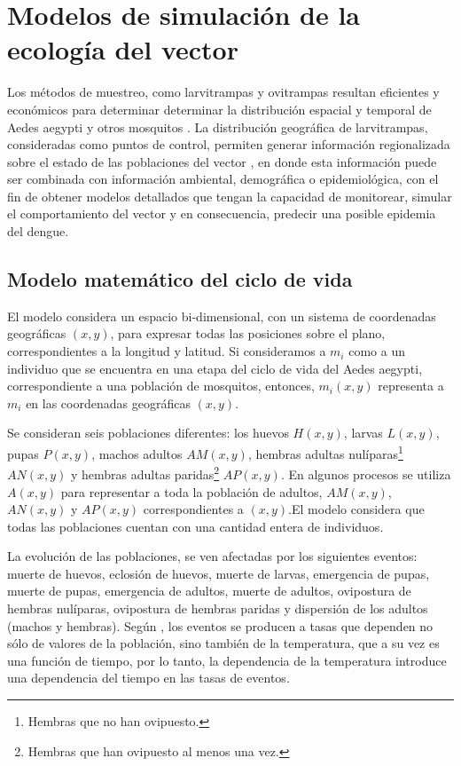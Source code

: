 \section{Modelos de simulación de la ecología del vector}
Los métodos de muestreo, como larvitrampas y ovitrampas resultan eficientes y económicos para
determinar determinar la distribución espacial y temporal de Aedes aegypti y otros mosquitos
\cite{dengueUruguayCap1, cenaprece2013}. La distribución geográfica de larvitrampas, consideradas
como puntos de control, permiten generar información regionalizada sobre el estado de las
poblaciones del vector \cite{NINO2011}, en donde esta información puede ser combinada con
información ambiental, demográfica o epidemiológica, con el fin de obtener modelos detallados que
tengan la capacidad de monitorear, simular el comportamiento del vector y en consecuencia,
predecir una posible epidemia del dengue.

\subsection{Modelo matemático del ciclo de vida}
El modelo considera un espacio bi-dimensional, con un sistema de coordenadas geográficas $(x,y)$,
para expresar todas las posiciones sobre el plano, correspondientes a la longitud y latitud. Si
consideramos a $m_{i}$ como a un individuo que se encuentra en una etapa del ciclo de vida del
Aedes aegypti, correspondiente a una población de mosquitos, entonces, $m_{i}(x,y)$ representa a
$m_{i}$ en las coordenadas geográficas $(x,y)$.

Se consideran seis poblaciones diferentes: los huevos $H(x,y)$, larvas $L(x,y)$, pupas $P(x,y)$,
machos adultos $AM(x,y)$, hembras adultas nulíparas\footnote{Hembras que no han ovipuesto.}
$AN(x,y)$ y hembras adultas paridas\footnote{Hembras que han ovipuesto al menos una vez.} $AP(x,y)$. En algunos procesos se utiliza $A(x, y)$ para representar a toda la población de adultos,
$AM(x,y)$, $AN(x,y)$ y $AP(x,y)$ correspondientes a $(x, y)$.El modelo considera que todas las poblaciones cuentan con una cantidad entera de individuos.

La evolución de las poblaciones, se ven afectadas por los siguientes eventos: muerte de huevos,
eclosión de huevos, muerte de larvas, emergencia de pupas, muerte de pupas, emergencia de adultos,
muerte de adultos, ovipostura de hembras nulíparas, ovipostura de hembras paridas y dispersión
de los adultos (machos y hembras). Según \cite{otero2006stochastic}, los eventos se producen a
tasas que dependen no sólo de valores de la población, sino también de la temperatura, que a su
vez es una función de tiempo, por lo tanto, la dependencia de la temperatura introduce una
dependencia del tiempo en las tasas de eventos.


